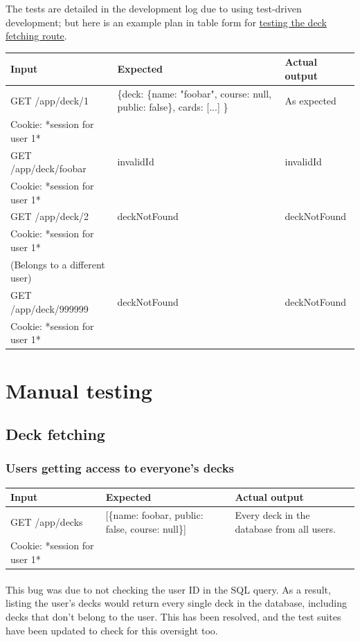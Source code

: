 \documentclass{report}
\begin{document}
The tests are detailed in the development log due to using test-driven development; but here is an example plan in table form for \hyperref[sec:deckcreation]{testing the deck fetching route}.

\begin{tabular}{|l|p{4cm}|p{4cm}|}
  \cline{1-3}
  Input & Expected & Actual output \\
  \hline \hline
  GET /app/deck/1 & \{deck: \{name: "foobar", course: null, public: false\}, cards: [...] \} & As expected \\
  Cookie: *session for user 1* && \\
  \hline \hline
  GET /app/deck/foobar & invalidId & invalidId \\
  Cookie: *session for user 1* && \\
  \hline \hline
  GET /app/deck/2 & deckNotFound & deckNotFound \\
  Cookie: *session for user 1* && \\
  (Belongs to a different user) && \\
  \hline \hline
  GET /app/deck/999999 & deckNotFound & deckNotFound \\
  Cookie: *session for user 1* && \\
  \hline
\end{tabular}

\section{Manual testing}
\subsection{Deck fetching}
\subsubsection{Users getting access to everyone's decks}

\begin{tabular}{|l|p{4cm}|p{4cm}|}
  \cline{1-3}
  Input & Expected & Actual output \\
  \hline \hline
  GET /app/decks & [\{name: foobar, public: false, course: null\}] & Every deck in the database from all users. \\
  Cookie: *session for user 1* && \\
  \hline
\end{tabular}

\paragraph{}
This bug was due to not checking the user ID in the SQL query. As a result, listing the user's decks would return every single deck in the database, including decks that don't belong to the user. This has been resolved, and the test suites have been updated to check for this oversight too.
\end{document}
